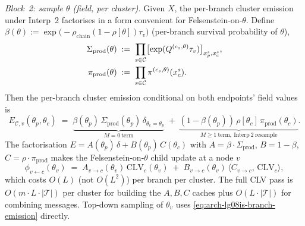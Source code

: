 \emph{Block~2: sample $\theta$ (field, per cluster).} Given $X$, the
per-branch cluster emission under Interp~2 factorises in a form
convenient for Felsenstein-on-$\theta$. Define
$\beta(\theta) := \exp\!\bigl(-\rho_{\mathrm{chain}}(1 - \rho[\theta])
\tau_v\bigr)$ (per-branch survival probability of $\theta$),
\begin{align*}
  \Sigma_{\mathrm{prod}}(\theta)
    &\;:=\; \prod_{s \in \mathcal{C}}
       \bigl[\exp(Q^{(c_s, \theta)} \tau_v)\bigr]_{x_p^s, x_c^s}, \\
  \pi_{\mathrm{prod}}(\theta)
    &\;:=\; \prod_{s \in \mathcal{C}} \pi^{(c_s, \theta)}(x_c^s).
\end{align*}
Then the per-branch cluster emission conditional on both endpoints'
field values is
\begin{equation}
  E_{\mathcal{C}, v}(\theta_p, \theta_c)
    \;=\;\underbrace{\beta(\theta_p)\,\Sigma_{\mathrm{prod}}(\theta_p)\,
                     \delta_{\theta_c = \theta_p}}_{M = 0\ \mathrm{term}}
      \;+\;\underbrace{(1 - \beta(\theta_p))\,\rho[\theta_c]\,
                       \pi_{\mathrm{prod}}(\theta_c)}_{M \ge 1\ \mathrm{term,\ Interp~2\ resample}}.
  \label{eq:arch-lg08is-branch-emission}
\end{equation}
The factorisation $E = A(\theta_p)\,\delta + B(\theta_p)\,C(\theta_c)$ with
$A = \beta \cdot \Sigma_{\mathrm{prod}}$, $B = 1 - \beta$,
$C = \rho \cdot \pi_{\mathrm{prod}}$ makes the Felsenstein-on-$\theta$
child update at a node $v$
\begin{equation}
  \phi_{v \leftarrow c}(\theta_v)
    \;=\; A_{v\to c}(\theta_v)\,\mathrm{CLV}_c(\theta_v)
      \;+\; B_{v\to c}(\theta_v)\,\bigl\langle C_{v\to c},\,\mathrm{CLV}_c\bigr\rangle,
  \label{eq:arch-lg08is-clv-theta}
\end{equation}
which costs $O(L)$ (not $O(L^2)$) per branch per cluster. The full CLV
pass is $O(m \cdot L \cdot |\mathcal{T}|)$ per cluster for building the
$A, B, C$ caches plus $O(L \cdot |\mathcal{T}|)$ for combining
messages. Top-down sampling of $\theta_v$ uses \eqref{eq:arch-lg08is-branch-emission}
directly.

